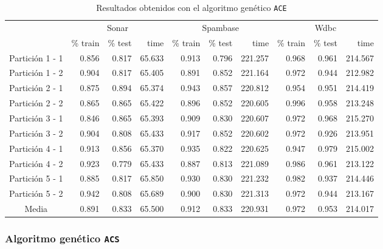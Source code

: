 \documentclass[11pt]{article}
\theoremstyle{plain}
\theoremstyle{definition}
\begin{document}
\begin{table}[H]
\centering
\caption{Resultados obtenidos con el algoritmo genético \texttt{ACE}}
\label{tbl-ace}
\begin{tabular}{@{}crrrrrrrrr@{}}
  \toprule
  & \multicolumn{3}{c}{Sonar} & \multicolumn{3}{c}{Spambase} & \multicolumn{3}{c}{Wdbc}  \\
  \cmidrule(r){2-10}
           & \% train & \% test & time & \% train   & \% test   & time & \% train & \% test & time \\
  \midrule
Partición 1 - 1      & 0.856 & 0.817 & 65.633 & 0.913 & 0.796 & 221.257 & 0.968 & 0.961 & 214.567 \\
Partición 1 - 2      & 0.904 & 0.817 & 65.405 & 0.891 & 0.852 & 221.164 & 0.972 & 0.944 & 212.982 \\
Partición 2 - 1      & 0.875 & 0.894 & 65.374 & 0.943 & 0.857 & 220.812 & 0.954 & 0.951 & 214.419 \\
Partición 2 - 2      & 0.865 & 0.865 & 65.422 & 0.896 & 0.852 & 220.605 & 0.996 & 0.958 & 213.248 \\
Partición 3 - 1      & 0.846 & 0.865 & 65.393 & 0.909 & 0.830 & 220.607 & 0.972 & 0.968 & 215.270 \\
Partición 3 - 2      & 0.904 & 0.808 & 65.433 & 0.917 & 0.852 & 220.602 & 0.972 & 0.926 & 213.951 \\
Partición 4 - 1      & 0.913 & 0.856 & 65.370 & 0.935 & 0.822 & 220.625 & 0.947 & 0.979 & 215.002 \\
Partición 4 - 2      & 0.923 & 0.779 & 65.433 & 0.887 & 0.813 & 221.089 & 0.986 & 0.961 & 213.122 \\
Partición 5 - 1      & 0.885 & 0.817 & 65.850 & 0.930 & 0.830 & 221.232 & 0.982 & 0.937 & 214.446 \\
Partición 5 - 2      & 0.942 & 0.808 & 65.689 & 0.900 & 0.830 & 221.313 & 0.972 & 0.944 & 213.167 \\
  \bottomrule
Media                & 0.891 & 0.833 & 65.500 & 0.912 & 0.833 & 220.931 & 0.972 & 0.953 & 214.017 \\
\end{tabular}
\end{table}

\subsubsection{Algoritmo genético \texttt{ACS}}
\end{document}

